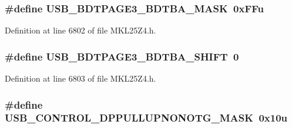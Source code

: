 \subsubsection[{\texorpdfstring{U\+S\+B\+\_\+\+B\+D\+T\+P\+A\+G\+E3\+\_\+\+B\+D\+T\+B\+A\+\_\+\+M\+A\+SK}{USB_BDTPAGE3_BDTBA_MASK}}]{\setlength{\rightskip}{0pt plus 5cm}\#define U\+S\+B\+\_\+\+B\+D\+T\+P\+A\+G\+E3\+\_\+\+B\+D\+T\+B\+A\+\_\+\+M\+A\+SK~0x\+F\+Fu}\hypertarget{group___u_s_b___register___masks_ga9081479345a744c85a74643600921b64}{}\label{group___u_s_b___register___masks_ga9081479345a744c85a74643600921b64}


Definition at line 6802 of file M\+K\+L25\+Z4.\+h.

\subsubsection[{\texorpdfstring{U\+S\+B\+\_\+\+B\+D\+T\+P\+A\+G\+E3\+\_\+\+B\+D\+T\+B\+A\+\_\+\+S\+H\+I\+FT}{USB_BDTPAGE3_BDTBA_SHIFT}}]{\setlength{\rightskip}{0pt plus 5cm}\#define U\+S\+B\+\_\+\+B\+D\+T\+P\+A\+G\+E3\+\_\+\+B\+D\+T\+B\+A\+\_\+\+S\+H\+I\+FT~0}\hypertarget{group___u_s_b___register___masks_ga9850caac94013a6e84f9af9cbe0e0827}{}\label{group___u_s_b___register___masks_ga9850caac94013a6e84f9af9cbe0e0827}


Definition at line 6803 of file M\+K\+L25\+Z4.\+h.

\subsubsection[{\texorpdfstring{U\+S\+B\+\_\+\+C\+O\+N\+T\+R\+O\+L\+\_\+\+D\+P\+P\+U\+L\+L\+U\+P\+N\+O\+N\+O\+T\+G\+\_\+\+M\+A\+SK}{USB_CONTROL_DPPULLUPNONOTG_MASK}}]{\setlength{\rightskip}{0pt plus 5cm}\#define U\+S\+B\+\_\+\+C\+O\+N\+T\+R\+O\+L\+\_\+\+D\+P\+P\+U\+L\+L\+U\+P\+N\+O\+N\+O\+T\+G\+\_\+\+M\+A\+SK~0x10u}\hypertarget{group___u_s_b___register___masks_ga764d9d972859eeded5e092a77eb4de79}{}\label{group___u_s_b___register___masks_ga764d9d972859eeded5e092a77eb4de79}


